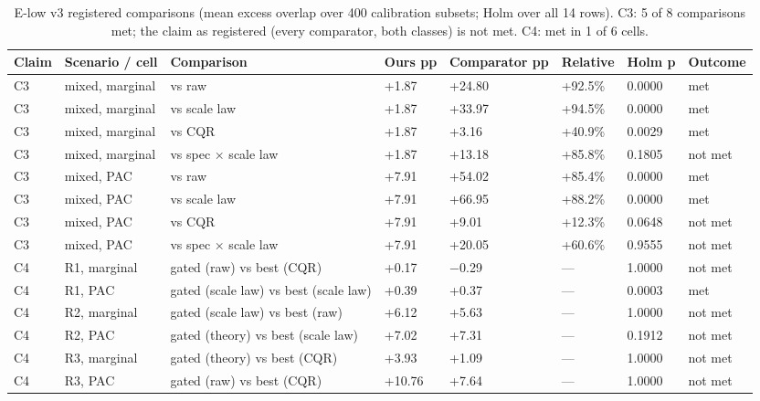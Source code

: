 \documentclass[preprint,12pt,authoryear]{elsarticle}
\begin{document}
\begin{table}[!htbp]
\centering
\scriptsize
\renewcommand{\thetable}{S16}\caption{E-low v3 registered comparisons (mean excess overlap over 400 calibration subsets; Holm over all 14 rows). C3: 5 of 8 comparisons met; the claim as registered (every comparator, both classes) is not met. C4: met in 1 of 6 cells.}
\begin{tabularx}{\textwidth}{@{}ll>{\raggedright\arraybackslash\hsize=1.00\hsize}Xlllll@{}}
\toprule
\textbf{Claim} & \textbf{Scenario / cell} & \textbf{Comparison} & \textbf{Ours pp} & \textbf{Comparator pp} & \textbf{Relative} & \textbf{Holm p} & \textbf{Outcome} \\
\midrule
C3 & mixed, marginal & vs raw & +1.87 & +24.80 & +92.5\% & 0.0000 & met \\
C3 & mixed, marginal & vs scale law & +1.87 & +33.97 & +94.5\% & 0.0000 & met \\
C3 & mixed, marginal & vs CQR & +1.87 & +3.16 & +40.9\% & 0.0029 & met \\
C3 & mixed, marginal & vs spec × scale law & +1.87 & +13.18 & +85.8\% & 0.1805 & not met \\
C3 & mixed, PAC & vs raw & +7.91 & +54.02 & +85.4\% & 0.0000 & met \\
C3 & mixed, PAC & vs scale law & +7.91 & +66.95 & +88.2\% & 0.0000 & met \\
C3 & mixed, PAC & vs CQR & +7.91 & +9.01 & +12.3\% & 0.0648 & not met \\
C3 & mixed, PAC & vs spec × scale law & +7.91 & +20.05 & +60.6\% & 0.9555 & not met \\
C4 & R1, marginal & gated (raw) vs best (CQR) & +0.17 & −0.29 & --- & 1.0000 & not met \\
C4 & R1, PAC & gated (scale law) vs best (scale law) & +0.39 & +0.37 & --- & 0.0003 & met \\
C4 & R2, marginal & gated (scale law) vs best (raw) & +6.12 & +5.63 & --- & 1.0000 & not met \\
C4 & R2, PAC & gated (theory) vs best (scale law) & +7.02 & +7.31 & --- & 0.1912 & not met \\
C4 & R3, marginal & gated (theory) vs best (CQR) & +3.93 & +1.09 & --- & 1.0000 & not met \\
C4 & R3, PAC & gated (raw) vs best (CQR) & +10.76 & +7.64 & --- & 1.0000 & not met \\
\bottomrule
\end{tabularx}
\end{table}
\end{document}
